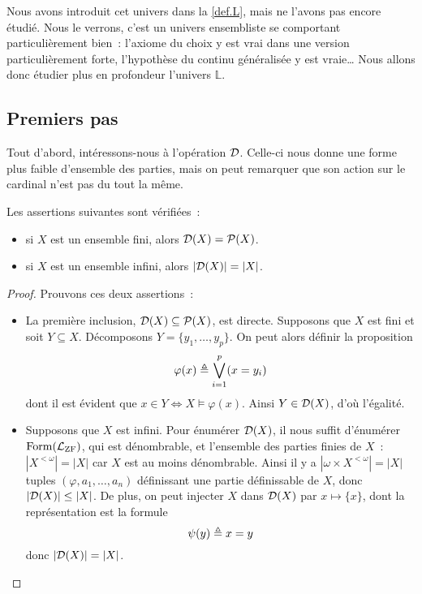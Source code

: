 Nous avons introduit cet univers dans la \cref{def.L}, mais ne l'avons pas
encore étudié. Nous le verrons, c'est un univers ensembliste se comportant
particulièrement bien~: l'axiome du choix y est vrai dans une version
particulièrement forte, l'hypothèse du continu généralisée y est vraie\ldots
Nous allons donc étudier plus en profondeur l'univers $\mathbb L$.

\subsection{Premiers pas}

Tout d'abord, intéressons-nous à l'opération $\mathcal{D}$. Celle-ci nous donne
une forme plus faible d'ensemble des parties, mais on peut remarquer que son
action sur le cardinal n'est pas du tout la même.

\begin{proposition}
  Les assertions suivantes sont vérifiées~:
  \begin{itemize}
  \item si $X$ est un ensemble fini, alors $\mathcal{D}(X) = \mathcal{P}(X)$.
  \item si $X$ est un ensemble infini, alors $|\mathcal{D}(X)| = |X|$.
  \end{itemize}
\end{proposition}

\begin{proof}
  Prouvons ces deux assertions~:
  \begin{itemize}
  \item La première inclusion, $\mathcal{D}(X)\subseteq\mathcal{P}(X)$, est directe.
    Supposons que $X$ est fini et soit $Y\subseteq X$. Décomposons
    $Y = \{y_1,\ldots,y_p\}$. On peut alors définir la proposition
    \[\varphi(x) \triangleq \bigvee_{i = 1}^p (x = y_i)\]
    dont il est évident que $x \in Y \iff X \models \varphi(x)$. Ainsi
    $Y\in \mathcal{D}(X)$, d'où l'égalité.
  \item Supposons que $X$ est infini. Pour énumérer $\mathcal{D}(X)$, il nous
    suffit d'énumérer $\operatorname{Form}(\mathcal L_{\operatorname{ZF}})$, qui est dénombrable, et
    l'ensemble des parties finies de $X$~: $|X^{<\omega}| = |X|$ car $X$ est
    au moins dénombrable. Ainsi il y a $|\omega \times X^{<\omega}| = |X|$
    tuples $(\varphi,a_1,\ldots,a_n)$ définissant une partie définissable de
    $X$, donc $|\mathcal{D}(X)|\leq |X|$. De plus, on peut injecter $X$ dans
    $\mathcal{D}(X)$ par $x\mapsto \{x\}$, dont la représentation est la
    formule
    \[\psi(y) \triangleq x = y \]
    donc $|\mathcal{D}(X)| = |X|$.
  \end{itemize}
\end{proof}

